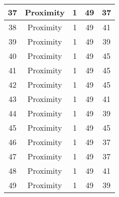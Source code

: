 \documentclass[results.tex]{subfiles}
\begin{document}
\begin{center}
\begin{tabular}{| c || c | c | c | c |}
            \hline
            37                      & Proximity                    & 1                      & 49                      & 37                   \\
            \hline
            38                      & Proximity                    & 1                      & 49                      & 41                   \\
            \hline
            39                      & Proximity                    & 1                      & 49                      & 39                   \\
            \hline
            40                      & Proximity                    & 1                      & 49                      & 45                   \\
            \hline
            41                      & Proximity                    & 1                      & 49                      & 45                   \\
            \hline
            42                      & Proximity                    & 1                      & 49                      & 45                   \\
            \hline
            43                      & Proximity                    & 1                      & 49                      & 41                   \\
            \hline
            44                      & Proximity                    & 1                      & 49                      & 39                   \\
            \hline
            45                      & Proximity                    & 1                      & 49                      & 45                   \\
            \hline
            46                      & Proximity                    & 1                      & 49                      & 37                   \\
            \hline
            47                      & Proximity                    & 1                      & 49                      & 37                   \\
            \hline
            48                      & Proximity                    & 1                      & 49                      & 41                   \\
            \hline
            49                      & Proximity                    & 1                      & 49                      & 39                   \\
            \hline
        \end{tabular}
    \end{center}
\end{document}

